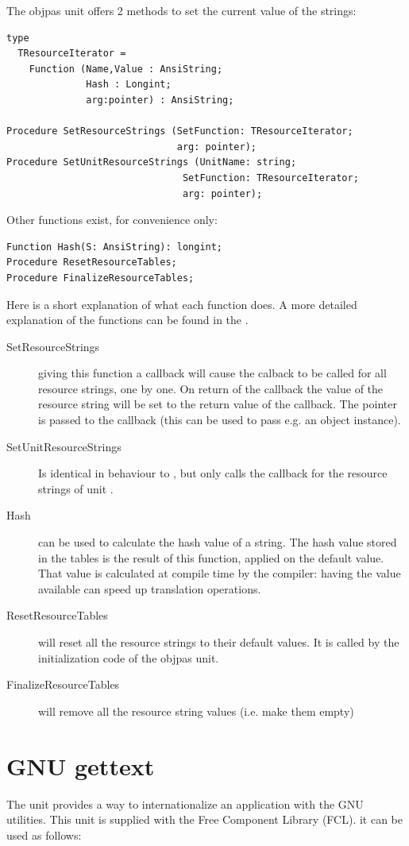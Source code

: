The objpas unit offers 2 methods to set the current value of the strings:
\begin{verbatim}
type
  TResourceIterator = 
    Function (Name,Value : AnsiString;  
              Hash : Longint; 
              arg:pointer) : AnsiString;

Procedure SetResourceStrings (SetFunction: TResourceIterator;
                              arg: pointer);
Procedure SetUnitResourceStrings (UnitName: string;
                               SetFunction: TResourceIterator;
                               arg: pointer);
\end{verbatim}
Other functions exist, for convenience only:
\begin{verbatim}
Function Hash(S: AnsiString): longint;
Procedure ResetResourceTables;
Procedure FinalizeResourceTables;
\end{verbatim}
Here is a short explanation of what each function does. A more detailed
explanation of the functions can be found in the .
\begin{description}
\item[SetResourceStrings] giving this function a callback will cause the
calback to be called for all resource strings, one by one. On return of the
callback the value of the resource string will be set to the return value 
of the callback. 
The  pointer is passed to the callback (this can be used to pass e.g. an object
instance).
\item[SetUnitResourceStrings] Is identical in behaviour to
, but only calls the callback for the resource
strings of unit .
\item [Hash] can be used to calculate the hash value of a string. The hash
value stored in the tables is the result of this function, applied on the
default value. That value is calculated at compile time by the compiler:
having the value available can speed up translation operations. 
\item[ResetResourceTables] will reset all the resource strings to their
default values. It is called by the initialization code of the objpas unit.
\item[FinalizeResourceTables] will remove all the resource string values
(i.e. make them empty)
\end{description}
\section{GNU gettext}
The unit  provides a way to internationalize an application
with the GNU  utilities. This unit is supplied with  the
Free Component Library (FCL). it can be used as follows:

